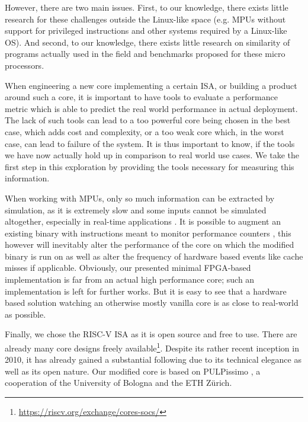 \documentclass[../bachelor_paper.tex]{subfiles}
\begin{document}
However, there are two main issues. First, to our knowledge, there exists little research for these challenges outside the Linux-like space (e.g. \ac{MPU}s without support for privileged instructions and other systems required by a Linux-like \ac{OS}). And second, to our knowledge, there exists little research on similarity of programs actually used in the field and benchmarks proposed for these micro processors.

When engineering a new core implementing a certain \ac{ISA}, or building a product around such a core, it is important to have tools to evaluate a performance metric which is able to predict the real world performance in actual deployment. The lack of such tools can lead to a too powerful core being chosen in the best case, which adds cost and complexity, or a too weak core which, in the worst case, can lead to failure of the system. It is thus important to know, if the tools we have now actually hold up in comparison to real world use cases. We take the first step in this exploration by providing the tools necessary for measuring this information.

When working with \ac{MPU}s, only so much information can be extracted by simulation, as it is extremely slow \cite{eeckhoutDesigningComputerArchitecture2003,kaoHardwareApproachRealTime2007} and some inputs cannot be simulated altogether, especially in real-time applications \cite{kaoHardwareApproachRealTime2007}. It is possible to augment an existing binary with instructions meant to monitor performance counters \cite{eeckhoutQuantifyingImpactInput}, this however will inevitably alter the performance of the core on which the modified binary is run on as well as alter the frequency of hardware based events like cache misses if applicable. Obviously, our presented minimal FPGA-based implementation is far from an actual high performance core; such an implementation is left for further works. But it is easy to see that a hardware based solution watching an otherwise mostly vanilla core is as close to real-world as possible.

Finally, we chose the RISC-V ISA \cite{RISCVTechnicalSpecification} as it is open source and free to use. There are already many core designs freely available\footnote{\url{https://riscv.org/exchange/cores-socs/}}. Despite its rather recent inception in 2010, it has already gained a substantial following due to its technical elegance as well as its open nature. Our modified core is based on PULPissimo \cite{PulpplatformPulpissimo2021}, a cooperation of the University of Bologna and the ETH Z\"urich.
\end{document}
